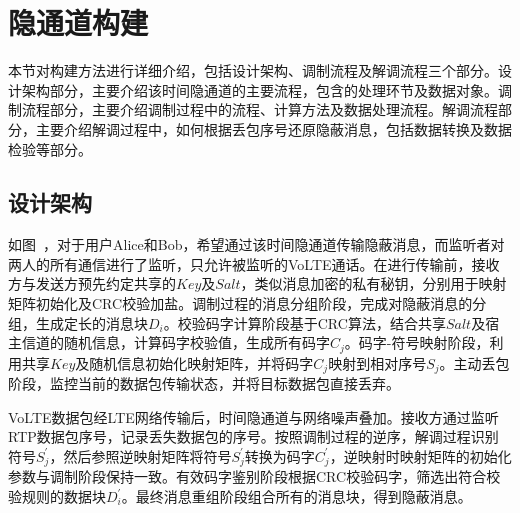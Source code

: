 \section{隐通道构建}
\label{chap:zigzag:model}

本节对构建方法进行详细介绍，包括设计架构、调制流程及解调流程三个部分。设计架构部分，主要介绍该时间隐通道的主要流程，包含的处理环节及数据对象。调制流程部分，主要介绍调制过程中的流程、计算方法及数据处理流程。解调流程部分，主要介绍解调过程中，如何根据丢包序号还原隐蔽消息，包括数据转换及数据检验等部分。

\subsection{设计架构}
\label{chap:zigzag:model:system}


如图\ ，对于用户Alice和Bob，希望通过该时间隐通道传输隐蔽消息，而监听者对两人的所有通信进行了监听，只允许被监听的VoLTE通话。在进行传输前，接收方与发送方预先约定共享的$Key$及$Salt$，类似消息加密的私有秘钥，分别用于映射矩阵初始化及CRC校验加盐。调制过程的消息分组阶段，完成对隐蔽消息的分组，生成定长的消息块$D_{i}$。校验码字计算阶段基于CRC算法，结合共享$Salt$及宿主信道的随机信息，计算码字校验值，生成所有码字$C_{j}$。码字-符号映射阶段，利用共享$Key$及随机信息初始化映射矩阵，并将码字$C_{j}$映射到相对序号$S_{j}$。主动丢包阶段，监控当前的数据包传输状态，并将目标数据包直接丢弃。

VoLTE数据包经LTE网络传输后，时间隐通道与网络噪声叠加。接收方通过监听RTP数据包序号，记录丢失数据包的序号。按照调制过程的逆序，解调过程识别符号$S_{j}^{'}$，然后参照逆映射矩阵将符号$S_{j}^{'}$转换为码字$C_{j}^{'}$，逆映射时映射矩阵的初始化参数与调制阶段保持一致。有效码字鉴别阶段根据CRC校验码字，筛选出符合校验规则的数据块$D_{i}^{'}$。最终消息重组阶段组合所有的消息块，得到隐蔽消息。

